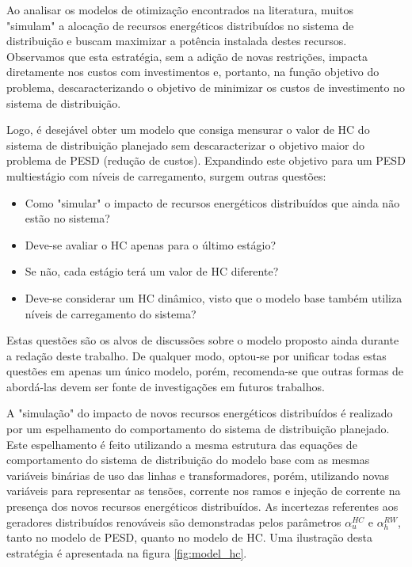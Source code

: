 Ao analisar os modelos de otimização encontrados na literatura, muitos "simulam"\; a alocação de recursos energéticos distribuídos no sistema de distribuição e buscam maximizar a potência instalada destes recursos. Observamos que esta estratégia, sem a adição de novas restrições, impacta diretamente nos custos com investimentos e, portanto, na função objetivo do problema, descaracterizando o objetivo de minimizar os custos de investimento no sistema de distribuição.

Logo, é desejável obter um modelo que consiga mensurar o valor de HC do sistema de distribuição planejado sem descaracterizar o objetivo maior do problema de \ac{PESD} (redução de custos).  Expandindo este objetivo para um \ac{PESD} multiestágio com níveis de carregamento, surgem outras questões:
\begin{itemize}
\item Como "simular"\; o impacto de recursos energéticos distribuídos que ainda não estão no sistema? 
\item Deve-se avaliar o HC apenas para o último estágio? 
\item Se não, cada estágio terá um valor de HC diferente? 
\item Deve-se considerar um HC dinâmico, visto que o modelo base também utiliza níveis de carregamento do sistema?
\end{itemize}

Estas questões são os alvos de discussões sobre o modelo proposto ainda durante a redação deste trabalho. De qualquer modo, optou-se por unificar todas estas questões em apenas um único modelo, porém, recomenda-se que outras formas de abordá-las devem ser fonte de investigações em futuros trabalhos.

A "simulação"\; do impacto de novos recursos energéticos distribuídos é realizado por um espelhamento do comportamento do sistema de distribuição planejado. Este espelhamento é feito utilizando a mesma estrutura das equações de comportamento do sistema de distribuição do modelo base com as mesmas variáveis binárias de uso das linhas e transformadores, porém, utilizando novas variáveis para representar as tensões, corrente nos ramos e injeção de corrente na presença dos novos recursos energéticos distribuídos. As incertezas referentes aos geradores distribuídos renováveis são demonstradas pelos parâmetros $\alpha^{HC}_u$ e $\alpha^{RW}_h$, tanto no modelo de \ac{PESD}, quanto no modelo de \ac{HC}.  Uma ilustração desta estratégia é apresentada na figura \ref{fig:model_hc}.

